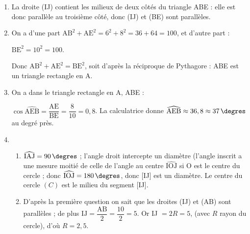 
\medskip

%

\begin{enumerate}
\item %
La droite (IJ) contient les milieux de deux côtés du triangle ABE : elle est donc parallèle au troisième côté, donc (IJ) et (BE) sont parallèles.

\item %
On a d'une part $\text{AB}^2 + \text{AE}^2 = 6^2 + 8^2 = 36 + 64 = 100$, et d'autre part :

$\text{BE}^2 = 10^2 = 100$.

Donc $\text{AB}^2 + \text{AE}^2  = \text{BE}^2$, soit d'après la réciproque de Pythagore : ABE est un triangle rectangle en A.
\item %
On a dans le triangle rectangle en A, ABE :

$\cos \widehat{\text{AEB}} = \dfrac{\text{AE}}{\text{BE}} = \dfrac{8}{10} = 0,8$. La calculatrice donne $\widehat{\text{AEB}} \approx 36,8 \approx 37\,\degres$ au degré près.
\item  
	\begin{enumerate}
		\item %
$\widehat{\text{IAJ}} = 90\,\degres$ ; l'angle droit intercepte un diamètre (l'angle inscrit a une mesure moitié de celle de l'angle 	au centre $\widehat{\text{IOJ}}$ si O est le centre du cercle ; donc $\widehat{\text{IOJ}} = 180\,\degres$, donc [IJ] est un diamètre. Le centre du cercle $(C)$ est le milieu du segment [IJ].
		\item %
D'après la première question on sait que les droites (IJ) et (AB) sont parallèles ; de plus $\text{IJ} = \dfrac{\text{AB}}{2} = \dfrac{10}{2} = 5$. Or IJ $ = 2R = 5$, (avec $R$ rayon du cercle),  d'où $R = 2,5$.
	\end{enumerate}
\end{enumerate}

\bigskip

